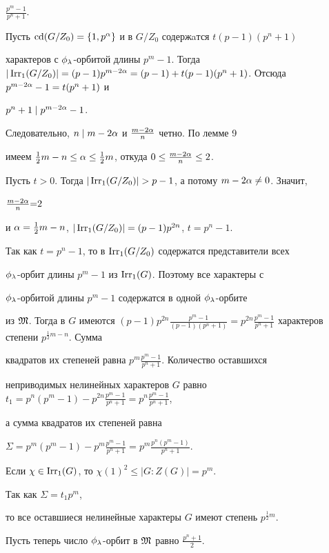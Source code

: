 $\frac{p^m-1}{p^n+1}$.





Пусть $\operatorname{cd}(G/Z_0)=\lbrace1,p^\alpha\rbrace$ и в $G/Z_0$ содержaтся $t(p-1)(p^n+1)$ 


характеров с $\phi_\la$-орбитой длины $p^m-1$. Тогда $|\Irr(G/Z_0)|=


(p-1)p^{m-2\al}=(p-1)+t(p-1)(p^n+1)$. Отсюда $p^{m-2\al}-1=t(p^n+1)$ и


$p^n+1\mid p^{m-2\alpha}-1$.


Следовательно, $n\mid m-2\alpha$ и $\frac{m-2\alpha}{n}$ четно. По лемме 9


имеем $\frac12m-n\le \alpha\le\frac12m$, откуда $0\le\frac{m-2\alpha}{n}\le2$.


Пусть $t>0$. Тогда $|\Irr(G/Z_0)|>p-1$, а потому $m-2\alpha\ne0$. Значит,


$\frac{m-2\alpha}{n}{=}2$


и $\alpha=\frac12m-n$, $|\operatorname{Irr_1}(G/Z_0)|=(p-1)p^{2n}$, $t=p^n-1$.


Так как $t=p^n-1$, то в $\operatorname{Irr_1}(G/Z_0)$ содержатся представители всех


$\phi_\lambda$-орбит длины $p^m-1$ из $\operatorname{Irr_1}(G)$. Поэтому все характеры с


$\phi_\lambda$-орбитой длины $p^m-1$ содержатся в одной $\phi_\lambda$-орбите


из $\frak M$. Тогда в $G$ имеются $(p-1)p^{2n}\frac{p^m-1}{(p-1)(p^n+1)}=


p^{2n}\frac{p^m-1}{p^n+1}$ характеров степени $p^{\frac12m-n}$. Сумма 


квадратов их степеней равна $p^m\frac{p^m-1}{p^n+1}$. Количество оставшихся


неприводимых нелинейных характеров $G$ равно $t_1=p^n(p^m-1)-


p^{2n}\frac{p^m-1}{p^n+1}=p^n\frac{p^m-1}{p^n+1}$,


а сумма квадратов их степеней равна


$\Sigma=p^m(p^m-1)-p^m\frac{p^m-1}{p^n+1}=p^m\frac{p^n(p^m-1)}{p^n+1}$.


Если $\chi\in\operatorname{Irr_1}(G)$, то $\chi(1)^2\le|G:Z(G)|=p^m$.


Так как $\Sigma=t_1p^m$,


то все оставшиеся нелинейные характеры $G$ имеют степень $p^{\frac12m}$.





Пусть теперь число $\phi_\lambda$-орбит в $\frak M$ равно $\frac{p^n+1}{2}$.


